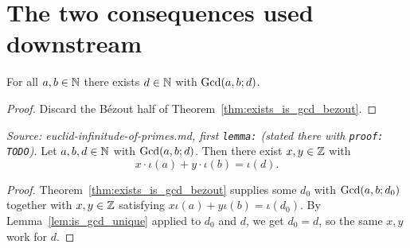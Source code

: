 \section{The two consequences used downstream}

\begin{corollary}
  \leanok
  \label{cor:exists_is_gcd}
  For all $a, b \in \mathbb{N}$ there exists $d \in \mathbb{N}$ with $\mathrm{Gcd}(a,b;d)$.
\end{corollary}
\begin{proof}
  \leanok
  Discard the B\'ezout half of Theorem~\ref{thm:exists_is_gcd_bezout}.
\end{proof}

\begin{lemma}
  \leanok
  \label{lem:bezout}
  \textit{Source: euclid-infinitude-of-primes.md, first \texttt{lemma:} (stated there with \texttt{proof: TODO}).}
  Let $a, b, d \in \mathbb{N}$ with $\mathrm{Gcd}(a,b;d)$. Then there exist $x, y \in \mathbb{Z}$
  with
  \[
    x \cdot \iota(a) + y \cdot \iota(b) = \iota(d) .
  \]
\end{lemma}
\begin{proof}
  \leanok
  Theorem~\ref{thm:exists_is_gcd_bezout} supplies some $d_0$ with
  $\mathrm{Gcd}(a,b;d_0)$ together with $x, y \in \mathbb{Z}$ satisfying
  $x\iota(a) + y\iota(b) = \iota(d_0)$. By Lemma~\ref{lem:is_gcd_unique} applied
  to $d_0$ and $d$, we get $d_0 = d$, so the same $x, y$ work for $d$.
\end{proof}
